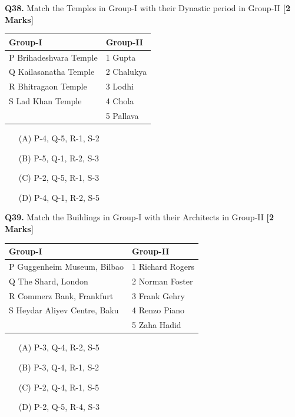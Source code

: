 \documentclass[11pt]{article}
\newcommand{\questionb}[2]{
    \noindent\textbf{Q#2.} #1 \hfill \textbf{[2 Marks]}
}
\begin{document}
\questionb{Match the Temples in Group-I with their Dynastic period in Group-II}{38}
\begin{tabularx}{\textwidth}{|l|X|}
\hline
\textbf{Group-I} & \textbf{Group-II} \\
\hline
P Brihadeshvara Temple & 1 Gupta \\
Q Kailasanatha Temple & 2 Chalukya \\
R Bhitragaon Temple & 3 Lodhi \\
S Lad Khan Temple & 4 Chola \\
 & 5 Pallava \\
\hline
\end{tabularx}
\begin{enumerate}
    \item[(A)] P-4, Q-5, R-1, S-2
    \item[(B)] P-5, Q-1, R-2, S-3
    \item[(C)] P-2, Q-5, R-1, S-3
    \item[(D)] P-4, Q-1, R-2, S-5
\end{enumerate}
\vspace{0.5cm}

\questionb{Match the Buildings in Group-I with their Architects in Group-II}{39}
\begin{tabularx}{\textwidth}{|l|X|}
\hline
\textbf{Group-I} & \textbf{Group-II} \\
\hline
P Guggenheim Museum, Bilbao & 1 Richard Rogers \\
Q The Shard, London & 2 Norman Foster \\
R Commerz Bank, Frankfurt & 3 Frank Gehry \\
S Heydar Aliyev Centre, Baku & 4 Renzo Piano \\
 & 5 Zaha Hadid \\
\hline
\end{tabularx}
\begin{enumerate}
    \item[(A)] P-3, Q-4, R-2, S-5
    \item[(B)] P-3, Q-4, R-1, S-2
    \item[(C)] P-2, Q-4, R-1, S-5
    \item[(D)] P-2, Q-5, R-4, S-3
\end{enumerate}
\vspace{0.5cm}
\end{document}

